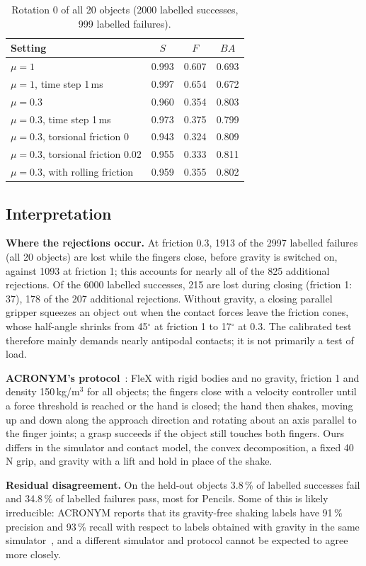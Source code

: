 \documentclass[conference]{IEEEtran}
\begin{document}
\begin{table}[!h]
  \centering
  \caption{Rotation 0 of all 20 objects (2000 labelled successes, 999 labelled failures).}
  \label{tab:robust}
  \begin{tabular}{@{}lccc@{}}
    \toprule
    Setting & $S$ & $F$ & $\mathit{BA}$ \\
    \midrule
    $\mu{=}1$ & 0.993 & 0.607 & 0.693 \\
    $\mu{=}1$, time step 1\,ms & 0.997 & 0.654 & 0.672 \\
    $\mu{=}0.3$ & 0.960 & 0.354 & 0.803 \\
    $\mu{=}0.3$, time step 1\,ms & 0.973 & 0.375 & 0.799 \\
    $\mu{=}0.3$, torsional friction 0 & 0.943 & 0.324 & 0.809 \\
    $\mu{=}0.3$, torsional friction 0.02 & 0.955 & 0.333 & 0.811 \\
    $\mu{=}0.3$, with rolling friction & 0.959 & 0.355 & 0.802 \\
    \bottomrule
  \end{tabular}
\end{table}

\subsection{Interpretation}\label{app:interp}

\textbf{Where the rejections occur.} At friction 0.3, 1913 of the 2997 labelled failures (all 20 objects)
are lost while the fingers close, before gravity is switched on, against 1093 at friction 1; this accounts
for nearly all of the 825 additional rejections. Of the 6000 labelled successes, 215 are lost during
closing (friction 1: 37), 178 of the 207 additional rejections. Without gravity, a closing parallel
gripper squeezes an object out when the contact forces leave the friction cones, whose half-angle shrinks
from 45$^\circ$ at friction 1 to 17$^\circ$ at 0.3. The calibrated test therefore mainly demands nearly
antipodal contacts; it is not primarily a test of load.

\textbf{ACRONYM's protocol}~\cite{eppner2021acronym}: FleX with rigid bodies and no gravity, friction 1
and density 150\,kg/m$^3$ for all objects; the fingers close with a velocity controller until a force
threshold is reached or the hand is closed; the hand then shakes, moving up and down along the approach
direction and rotating about an axis parallel to the finger joints; a grasp succeeds if the object still
touches both fingers. Ours differs in the simulator and contact model, the convex decomposition, a fixed
40\,N grip, and gravity with a lift and hold in place of the shake.

\textbf{Residual disagreement.} On the held-out objects 3.8\,\% of labelled successes fail and 34.8\,\% of
labelled failures pass, most for Pencils. Some of this is likely irreducible: ACRONYM reports that its
gravity-free shaking labels have 91\,\% precision and 93\,\% recall with respect to labels obtained with
gravity in the same simulator~\cite{eppner2021acronym}, and a different simulator and protocol cannot be
expected to agree more closely.
\end{document}
